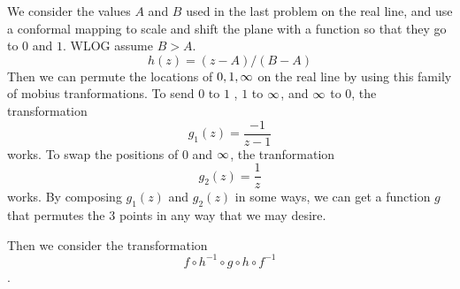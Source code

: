 \documentclass{homework}
\begin{document}
                                                                                                                        \begin{solution}
                                                                                                                        We consider the values $A$ and $B$ used in the last problem on the real line, and use a conformal mapping to scale and shift the plane with a function so that they go to $0$ and $1$. WLOG assume $B>A.$
                                                                                                                        \[
                                                                                                                        h(z) = (z - A)/(B - A)
                                                                                                                        \]
                                                                                                                        Then we can permute the locations of $0, 1, \infty$ on the real line by using this family of mobius tranformations. To send $0$ to $1$ , $1$ to $\infty$, and $\infty$ to $0$, the transformation
                                                                                                                        \[
                                                                                                                        g_1(z) = \frac{-1}{z-1}
                                                                                                                        \]
                                                                                                                        works. To swap the positions of $0$ and $\infty$, the tranformation 
                                                                                                                        \[
                                                                                                                        g_2(z) = \frac{1}{z}
                                                                                                                        \]
                                                                                                                        works. By composing $g_1(z)$ and $g_2(z)$ in some ways, we can get a function $g$ that permutes the 3 points in any way that we may desire.

                                                                                                                        Then we consider the transformation
                                                                                                                        \[
                                                                                                                        f\circ h^{-1}\circ g\circ h\circ f^{-1}
                                                                                                                        \].


\end{solution}
\end{document}
